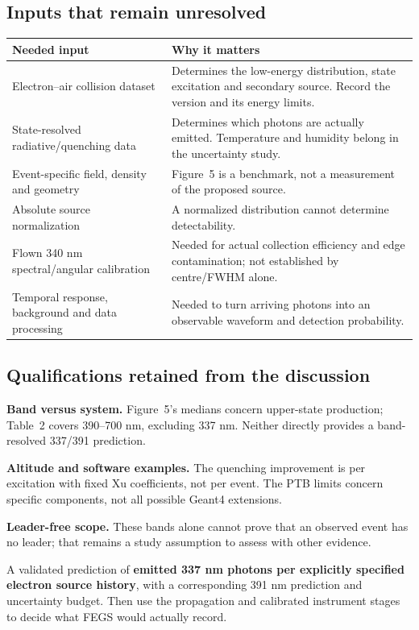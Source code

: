 \documentclass[11pt,a4paper]{article}
\begin{document}
\subsection*{Inputs that remain unresolved}
\begin{center}
\small
\begin{tabularx}{\textwidth}{@{}P{42mm}Y@{}}
\toprule
\textbf{Needed input} & \textbf{Why it matters}\\
\midrule
Electron--air collision dataset & Determines the low-energy distribution, state excitation and secondary source. Record the version and its energy limits.\\
State-resolved radiative/quenching data & Determines which photons are actually emitted. Temperature and humidity belong in the uncertainty study.\\
Event-specific field, density and geometry & Figure~5 is a benchmark, not a measurement of the proposed source.\\
Absolute source normalization & A normalized distribution cannot determine detectability.\\
Flown 340 nm spectral/angular calibration & Needed for actual collection efficiency and edge contamination; not established by centre/FWHM alone.\\
Temporal response, background and data processing & Needed to turn arriving photons into an observable waveform and detection probability.\\
\bottomrule
\end{tabularx}
\end{center}

\subsection*{Qualifications retained from the discussion}
\textbf{Band versus system.} Figure~5's medians concern upper-state production; Table~2 covers 390--700 nm, excluding 337 nm. Neither directly provides a band-resolved 337/391 prediction.

\textbf{Altitude and software examples.} The quenching improvement is per excitation with fixed Xu coefficients, not per event. The PTB limits concern specific components, not all possible Geant4 extensions.

\textbf{Leader-free scope.} These bands alone cannot prove that an observed event has no leader; that remains a study assumption to assess with other evidence.

\begin{keybox}
A validated prediction of \textbf{emitted 337 nm photons per explicitly specified electron source history}, with a corresponding 391 nm prediction and uncertainty budget. Then use the propagation and calibrated instrument stages to decide what FEGS would actually record.
\end{keybox}
\end{document}

